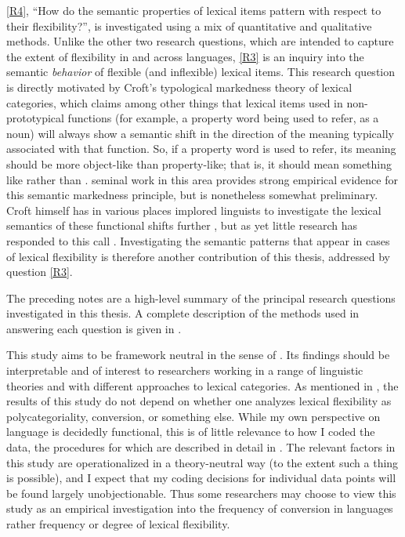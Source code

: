 \ref{R4}, \enquote{How do the semantic properties of lexical items pattern with respect to their flexibility?}, is investigated using a mix of quantitative and qualitative methods. Unlike the other two research questions, which are intended to capture the extent of flexibility in and across languages, \ref{R3} is an inquiry into the semantic \emph{behavior} of flexible (and inflexible) lexical items. This research question is directly motivated by Croft's \parencites*{Croft1991}{Croft2000}{Croft2001b}{Croftfc} typological markedness theory of lexical categories, which claims among other things that lexical items used in non-prototypical functions (for example, a property word being used to refer, as a noun) will always show a semantic shift in the direction of the meaning typically associated with that function. So, if a property word is used to refer, its meaning should be more object-like than property-like; that is, it should mean something like  rather than .  seminal work in this area provides strong empirical evidence for this semantic markedness principle, but is nonetheless somewhat preliminary. Croft himself has in various places implored linguists to investigate the lexical semantics of these functional shifts further \parencites[440]{Croft2005}[70]{CroftLier2012}, but as yet little research has responded to this call . Investigating the semantic patterns that appear in cases of lexical flexibility is therefore another contribution of this thesis, addressed by question \ref{R3}.

The preceding notes are a high-level summary of the principal research questions investigated in this thesis. A complete description of the methods used in answering each question is given in .

This study aims to be framework neutral in the sense of \textcite{Haspelmath2010b}. Its findings should be interpretable and of interest to researchers working in a range of linguistic theories and with different approaches to lexical categories. As mentioned in , the results of this study do not depend on whether one analyzes lexical flexibility as polycategoriality, conversion, or something else. While my own perspective on language is decidedly functional, this is of little relevance to how I coded the data, the procedures for which are described in detail in . The relevant factors in this study are operationalized in a theory-neutral way (to the extent such a thing is possible), and I expect that my coding decisions for individual data points will be found largely unobjectionable. Thus some researchers may choose to view this study as an empirical investigation into the frequency of conversion in languages rather frequency or degree of lexical flexibility.

